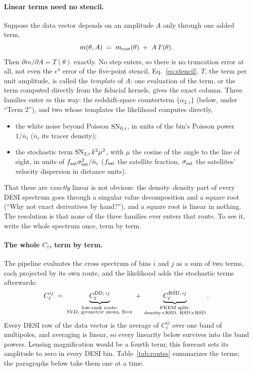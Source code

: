 \documentclass[11pt]{article}
\newcommand{\SNzi}{{\rm SN}_{0,i}}
\newcommand{\SNti}{{\rm SN}_{2,i}}
\begin{document}
\paragraph{Linear terms need no stencil.}
Suppose the data vector depends on an amplitude $A$ only through one
added term,
\begin{equation}
  m(\theta, A) \;=\; m_{\rm rest}(\theta) \;+\; A\,T(\theta) .
  \label{eq:lineardef}
\end{equation}
Then $\partial m/\partial A = T(\theta)$ exactly.  No step enters, so
there is no truncation error at all, not even the $\epsilon^4$ error
of the five-point stencil, Eq.~\eqref{eq:stencil}.  $T$, the term per
unit amplitude, is called the \emph{template} of $A$: one evaluation
of the term, or the term computed directly from the fiducial kernels,
gives the exact column.  Three families enter $m$ this way: the
redshift-space counterterm $\{\alpha_{2,i}\}$ (below, under ``Term
2''), and two whose templates the likelihood computes directly,
\begin{itemize}
  \item the white noise beyond Poisson $\SNzi$, in units of the bin's
    Poisson power $1/\bar{n}_i$ ($\bar{n}_i$ its tracer density);
  \item the stochastic term $\SNti\,k^2\mu^2$, with $\mu$ the cosine of
    the angle to the line of sight, in units of
    $f_{\rm sat}\sigma_{\rm sat}^2/\bar{n}_i$ ($f_{\rm sat}$ the
    satellite fraction, $\sigma_{\rm sat}$ the satellites' velocity
    dispersion in distance units).
\end{itemize}
That these are \emph{exactly} linear is not obvious: the
density--density part of every DESI spectrum goes through a singular
value decomposition and a square root (``Why not exact derivatives by
hand?''), and a square root is linear in nothing.  The resolution is
that none of the three families ever enters that route.  To see it,
write the whole spectrum once, term by term.

\paragraph{The whole $C_\ell$, term by term.}
The pipeline evaluates the cross spectrum of bins $i$ and $j$ as a sum
of two terms, each projected by its own route, and the likelihood
adds the stochastic terms afterwards:
\begin{equation}
  C_\ell^{ij} \;=\;
  \underbrace{C_\ell^{{\rm DD},\,ij}}_{\substack{\text{low-rank
        route:}\\ \text{SVD, geometric mean, floor}}}
  \;+\;
  \underbrace{C_\ell^{{\rm RSD},\,ij}}_{\substack{\text{FKEM split:}\\
      \text{density$\times$RSD, RSD$\times$RSD}}} .
  \label{eq:hybrid}
\end{equation}
Every DESI row of the data vector is the average of $C_\ell^{ij}$ over
one band of multipoles, and averaging is linear, so every linearity
below survives into the band powers.  Lensing magnification would be a
fourth term; this forecast sets its amplitude to zero in every DESI
bin.  Table~\ref{tab:routes} summarizes the terms; the paragraphs
below take them one at a time.
\end{document}
